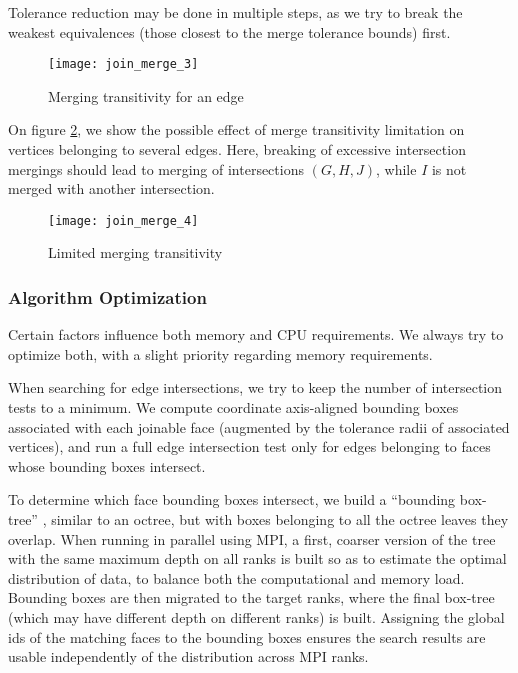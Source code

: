 Tolerance reduction may be done in multiple steps, as we
try to break the weakest equivalences (those closest to
the merge tolerance bounds) first.

\begin{figure}[!h]
\centerline{
\texttt{[image: join\_merge\_3]}}
\caption{Merging transitivity for an edge}
\label{fig:algo.merging.pb_2}
\end{figure}

On figure \ref{fig:algo.merging.pb_3}, we show the possible
effect of merge transitivity limitation on vertices belonging to several edges.
Here, breaking of excessive intersection mergings should lead to
merging of intersections $(G, H, J)$, while $I$ is not merged
with another intersection.

\begin{figure}[!h]
\centerline{
\texttt{[image: join\_merge\_4]}}
\caption{Limited merging transitivity}
\label{fig:algo.merging.pb_3}
\end{figure}

\subsubsection{Algorithm Optimization\label{sec:join.optim}}

Certain factors influence both memory and CPU requirements. We always
try to optimize both, with a slight priority regarding memory
requirements.

When searching for edge intersections, we try to keep the number of intersection
tests to a minimum. We compute coordinate axis-aligned bounding boxes associated
with each joinable face (augmented by the tolerance radii of associated
vertices), and run a full edge intersection test only for
edges belonging to faces whose bounding boxes intersect.

To determine which face bounding boxes intersect, we build a ``bounding
box-tree'' , similar to an octree, but with boxes belonging to all
the octree leaves they overlap. When running in parallel using MPI, a first,
coarser version of the tree with the same maximum depth on all ranks is built
so as to estimate the optimal distribution of data, to balance both the computational
and memory load. Bounding boxes are then migrated to the target ranks,
where the final box-tree (which may have different depth on different ranks)
is built. Assigning the global ids of the matching faces to the bounding boxes
ensures the search results are usable independently of the distribution
across MPI ranks.

